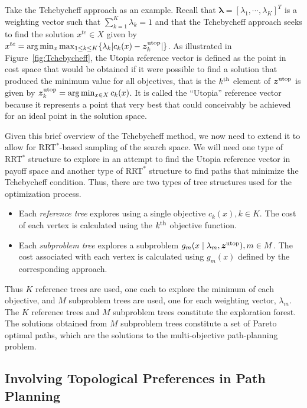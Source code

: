 \documentclass[phd]{byuprop}
\begin{document}
Take the Tchebycheff approach as an example.
Recall that  $ \bm{\lambda} = [ \lambda_{1} , \cdots , \lambda_{K}  ]^{T} $ is a weighting vector such that $ \sum_{k=1}^{K} \lambda_{k} = 1 $ and that the Tchebycheff approach seeks to find the solution $ x^{te}\in X $ given by $ x^{te} = \arg\min_x \max_{1 \leq k \leq K}  \{ \lambda_{k} | c_{k}(x) - \bm{z}^{\rm utop}_{k}  | \} $.  
As illustrated in Figure~\ref{fig:Tchebycheff}, the Utopia reference vector is defined as the point in cost space that would be obtained if it were possible to find a solution that produced the minimum value for all objectives, that is the $k^{\rm th}$ element of $\bm{z}^{\rm utop}$ is given by $\bm{z}^{\rm utop}_{k} = \arg \min_{x \in X} c_{k}(x)$.  
It is called the ``Utopia'' reference vector because it represents a point that very best that could conceivably be achieved for an ideal point in the solution space.

Given this brief overview of the Tchebycheff method, we now need to extend it to allow for RRT$^{*}$-based sampling of the search space.  
We will need one type of RRT$^{*}$ structure to explore in an attempt to find the Utopia reference vector in payoff space and another type of RRT$^{*}$ structure to find paths that minimize the Tchebycheff condition. %
Thus, there are two types of tree structures used for the optimization process.
\begin{itemize}
	\item Each \emph{reference tree} explores using a single objective $ c_{k} (x), k \in K $. 
	The cost of each vertex is calculated using the $ k^{\rm th} $ objective function.
	\item Each \emph{subproblem tree} explores a subproblem $ g_{m} ( x \mid \lambda_{m} , \bm{z}^{\rm utop} ) , m \in M $.
	The cost associated with each vertex is calculated using $ g_{m}(x) $ defined by the corresponding approach.
\end{itemize}
Thus $ K $ reference trees are used, one each to explore the minimum of each objective, and $ M $ subproblem trees are used, one for each weighting vector, $ \lambda_{m} $.  
The $K$ reference trees and $M$ subproblem trees constitute the exploration forest.
The solutions obtained from $ M $ subproblem trees constitute a set of Pareto optimal paths, which are the solutions to the multi-objective path-planning problem. 


\subsection{Involving Topological Preferences in Path Planning}
\label{sec:project_description:involving_topological_preferences_in_path_planning}
\end{document}
